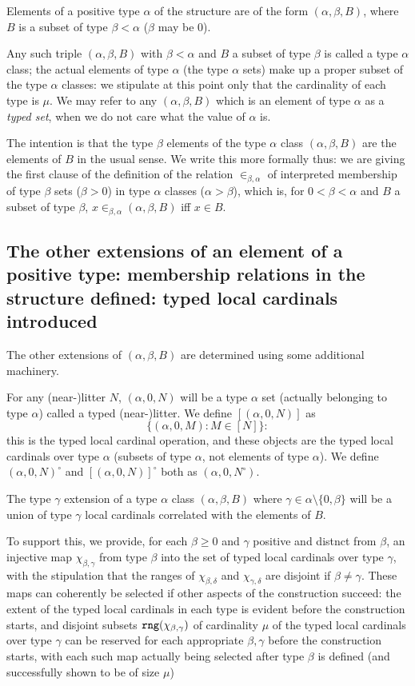 \documentclass[12pt]{article}
\begin{document}
Elements of a positive type $\alpha$ of the structure are of the form $(\alpha,\beta,B)$, where $B$ is a subset of type $\beta<\alpha$ ($\beta$ may be 0).

Any such triple $(\alpha,\beta,B)$  with $\beta<\alpha$ and $B$ a subset of type $\beta$ is called a type $\alpha$ class;  the actual elements of type $\alpha$ (the type $\alpha$ sets) make up  a proper subset of the type $\alpha$ classes:  we stipulate at this point only that
the cardinality of each type is $\mu$.  We may refer to any $(\alpha,\beta,B)$ which is an element of type $\alpha$ as a {\em  typed set\/}, when we do not care what the value of $\alpha$ is.

The intention is that the type $\beta$ elements of the type $\alpha$ class $(\alpha,\beta,B)$ are the elements of $B$ in the usual sense.  We write this more formally
thus:  we are giving the first clause of the definition of the relation $\in_{\beta,\alpha}$ of interpreted membership of type $\beta$ sets ($\beta>0$)  in type $\alpha$ classes ($\alpha>\beta$), which is, for $0<\beta<\alpha$ and $B$ a subset of type $\beta$,  $x \in_{\beta,\alpha} (\alpha,\beta,B)$ iff $x \in B$.

\subsection{The other extensions of an element of a positive type:  membership relations in the structure defined:  typed local cardinals introduced}

The other extensions of $(\alpha,\beta,B)$ are determined using some additional machinery.

For any (near-)litter  $N$, $(\alpha,0,N)$ will be a type $\alpha$ set (actually belonging to type $\alpha$) called a typed (near-)litter.  We define $[(\alpha,0,N)]$ as $$\{(\alpha,0,M):M \in [N]\}:$$ this is the typed local cardinal operation,
and these objects are the typed local cardinals over type $\alpha$ (subsets of type $\alpha$, not elements of type $\alpha$).  We define $(\alpha,0,N)^\circ$ and $[(\alpha,0,N)]^\circ$ both as $(\alpha,0,N^\circ)$.

The type $\gamma$ extension of a type $\alpha$ class $(\alpha,\beta,B)$ where $\gamma \in \alpha \setminus \{0,\beta\}$ will be a union of type $\gamma$ local cardinals correlated with the elements of $B$.  

To support this, we provide, for each $\beta\geq 0$ and $\gamma$ positive and distnct from $\beta$, an injective  map $\chi_{\beta,\gamma}$ from type $\beta$ into  the set of typed local cardinals over type $\gamma$, with the stipulation that the ranges
of $\chi_{\beta,\delta}$ and $\chi_{\gamma,\delta}$ are disjoint if $\beta \neq \gamma$.  These maps can coherently be selected if other aspects of the construction succeed:  the extent of the typed local cardinals in each type
is evident before the construction starts, and disjoint subsets ${\tt rng}(\chi_{\beta,\gamma})$ of cardinality $\mu$ of the typed local cardinals over type $\gamma$ can be reserved for each appropriate $\beta, \gamma$ before the construction starts, with each such map actually being selected after type $\beta$ is defined (and successfully shown to be of size $\mu$)
\end{document}

